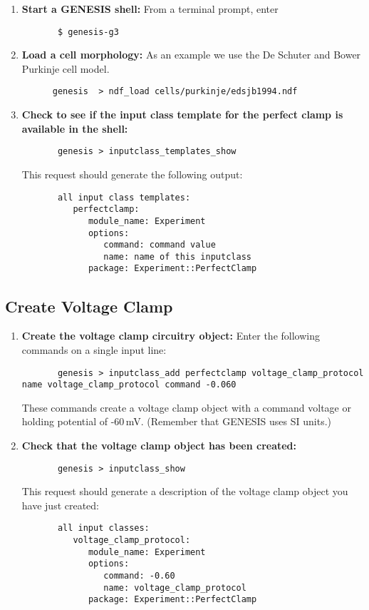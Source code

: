 \documentclass[12pt]{article}
\begin{document}
\begin{enumerate}
	\item{\bf Start a GENESIS shell:} From a terminal prompt, enter
	\begin{verbatim}
	   $ genesis-g3
	\end{verbatim}
	
	\item{\bf Load a cell morphology:} As an example we use the De Schuter and Bower Purkinje cell model.
	\begin{verbatim}
	  genesis  > ndf_load cells/purkinje/edsjb1994.ndf
	\end{verbatim}
	
	\item{\bf Check to see if the input class template for the perfect clamp is available in the shell:}
	\begin{verbatim}
	   genesis > inputclass_templates_show
	\end{verbatim}
	This request should generate the following output:
	\begin{verbatim}
	   all input class templates: 
	      perfectclamp:
	         module_name: Experiment
	         options:
	            command: command value
	            name: name of this inputclass
	         package: Experiment::PerfectClamp
	\end{verbatim}	
\end{enumerate}

\subsection*{Create Voltage Clamp}

\begin{enumerate}

	\item{\bf Create the voltage clamp circuitry object:} Enter the following commands on a single input line:
	\begin{verbatim}
	   genesis > inputclass_add perfectclamp voltage_clamp_protocol name voltage_clamp_protocol command -0.060
	\end{verbatim}
	These commands create a voltage clamp object with a command voltage or holding potential of -60\,mV. (Remember that GENESIS uses SI units.)
	
	\item{\bf Check that the voltage clamp object has been created:}
	\begin{verbatim}
	   genesis > inputclass_show
	\end{verbatim}
	This request should generate a description of the voltage clamp object you have just created:
	\begin{verbatim}
	   all input classes: 
	      voltage_clamp_protocol:
	         module_name: Experiment
	         options:
	            command: -0.60
	            name: voltage_clamp_protocol
	         package: Experiment::PerfectClamp
	\end{verbatim}
\end{enumerate}
\end{document}
